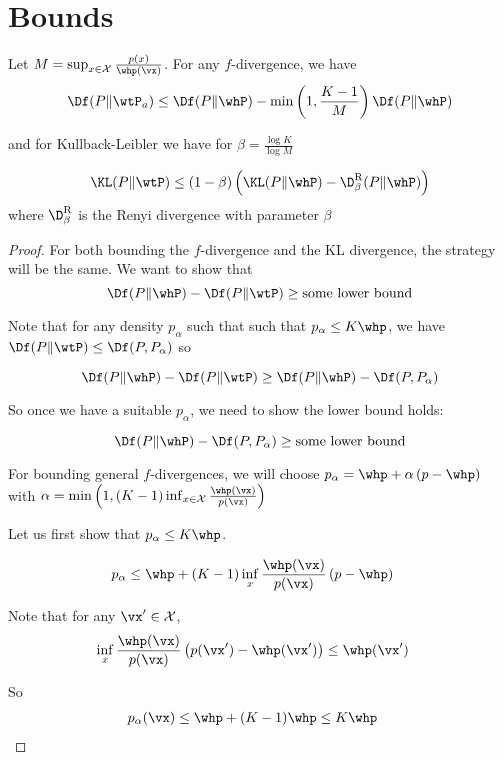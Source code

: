 \documentclass[twoside]{article}
\begin{document}
\section{Bounds}\label{app:sec:bounds}
\begin{theorem}
Let $M=\sup_{x\in\mathcal{X}}\frac{p(x)}{\whp(\vx)}$. For any $f$-divergence,
we have 
\[
\Df(P\Vert\wtP_a)\le\Df(P\Vert\whP)-\min\left(1,\frac{K-1}{M}\right)\Df(P\Vert\whP)
\]

and for Kullback-Leibler we have for $\beta=\frac{\log K}{\log M}$

\[
\KL(P\Vert\wtP)\le(1-\beta)\left(\KL(P\Vert\whP)-\D^\mathrm{R}_{\beta}(P\Vert\whP)\right)
\]
where $\D^\mathrm{R}_{\beta}$ is the Renyi divergence with parameter $\beta$ 
\end{theorem}
\begin{proof}
For both bounding the $f$-divergence and the KL divergence, the strategy
will be the same. We want to show that 
\[
\Df(P\Vert\whP)-\Df(P\Vert\wtP)\ge\text{some lower bound}
\]

Note that for any density $p_{\alpha}$ such that such that $p_{\alpha}\le K\whp$,
we have $\Df(P\Vert\wtP)\le\Df(P,P_{\alpha})$ so

\[
\Df(P\Vert\whP)-\Df(P\Vert\wtP)\ge\Df(P\Vert\whP)-\Df(P,P_{\alpha})
\]

So once we have a suitable $p_{\alpha}$, we need to show the lower
bound holds:

\[
\Df(P\Vert\whP)-\Df(P,P_{\alpha})\ge\text{some lower bound}
\]

For bounding general $f$-divergences, we will choose $p_{\alpha}=\whp+\alpha\left(p-\whp\right)$
with $\alpha=\min\left(1,(K-1)\inf_{x\in\mathcal{X}}\frac{\whp(\vx)}{p(\vx)}\right)$

Let us first show that $p_{\alpha}\le K\whp$. 

\begin{align*}
p_{\alpha} & \le\whp+(K-1)\inf_{x}\frac{\whp(\vx)}{p(\vx)}\left(p-\whp\right)
\end{align*}

Note that for any $\vx'\in\mathcal{X}$, 
\begin{align*}
\inf_{x}\frac{\whp(\vx)}{p(\vx)}\left(p(\vx')-\whp(\vx')\right) & \le\whp(\vx')
\end{align*}

So 
\begin{align*}
p_{\alpha}(\vx) & \le\whp+(K-1)\whp\le K\whp
\end{align*}


\end{proof}
\end{document}
